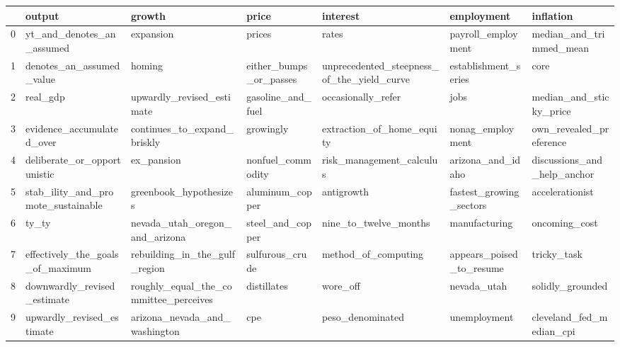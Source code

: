 \begin{tabular}{lllllll}
\toprule
{} &                              output &                                 growth &                   price &                                    interest &                employment &                    inflation \\
\midrule
0 &           yt\_and\_denotes\_an\_assumed &                              expansion &                  prices &                                       rates &        payroll\_employment &      median\_and\_trimmed\_mean \\
1 &            denotes\_an\_assumed\_value &                                 homing &  either\_bumps\_or\_passes &  unprecedented\_steepness\_of\_the\_yield\_curve &      establishment\_series &                         core \\
2 &                            real\_gdp &              upwardly\_revised\_estimate &       gasoline\_and\_fuel &                          occasionally\_refer &                      jobs &      median\_and\_sticky\_price \\
3 &           evidence\_accumulated\_over &            continues\_to\_expand\_briskly &               growingly &                   extraction\_of\_home\_equity &          nonag\_employment &      own\_revealed\_preference \\
4 &         deliberate\_or\_opportunistic &                             ex\_pansion &       nonfuel\_commodity &                    risk\_management\_calculus &         arizona\_and\_idaho &  discussions\_and\_help\_anchor \\
5 &  stab\_ility\_and\_promote\_sustainable &                 greenbook\_hypothesizes &         aluminum\_copper &                                  antigrowth &   fastest\_growing\_sectors &              accelerationist \\
6 &                               ty\_ty &         nevada\_utah\_oregon\_and\_arizona &        steel\_and\_copper &                       nine\_to\_twelve\_months &             manufacturing &                oncoming\_cost \\
7 &    effectively\_the\_goals\_of\_maximum &          rebuilding\_in\_the\_gulf\_region &         sulfurous\_crude &                         method\_of\_computing &  appears\_poised\_to\_resume &                  tricky\_task \\
8 &         downwardly\_revised\_estimate &  roughly\_equal\_the\_committee\_perceives &             distillates &                                    wore\_off &               nevada\_utah &             solidly\_grounded \\
9 &           upwardly\_revised\_estimate &          arizona\_nevada\_and\_washington &                     cpe &                            peso\_denominated &              unemployment &     cleveland\_fed\_median\_cpi \\
\bottomrule
\end{tabular}
